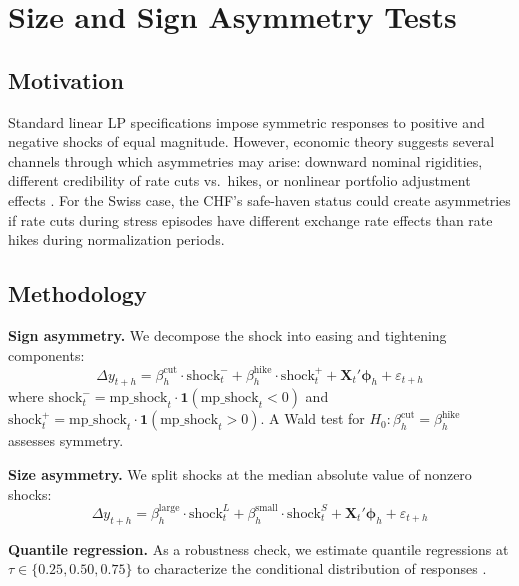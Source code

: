\documentclass[12pt,a4paper]{article}
\begin{document}
\section{Size and Sign Asymmetry Tests}\label{sec:asymmetry}

\subsection{Motivation}

Standard linear LP specifications impose symmetric responses to positive and negative shocks of equal magnitude. However, economic theory suggests several channels through which asymmetries may arise: downward nominal rigidities, different credibility of rate cuts vs.\ hikes, or nonlinear portfolio adjustment effects \citep{tenreyro2016}. For the Swiss case, the CHF's safe-haven status \citep{ranaldo2010} could create asymmetries if rate cuts during stress episodes have different exchange rate effects than rate hikes during normalization periods.

\subsection{Methodology}

\textbf{Sign asymmetry.} We decompose the shock into easing and tightening components:
\begin{equation}
	\Delta y_{t+h} = \beta_h^{\text{cut}} \cdot \text{shock}_t^{-} + \beta_h^{\text{hike}} \cdot \text{shock}_t^{+} + \boldsymbol{X}_t'\boldsymbol{\phi}_h + \varepsilon_{t+h}
\end{equation}
where $\text{shock}_t^{-} = \text{mp\_shock}_t \cdot \mathbf{1}(\text{mp\_shock}_t < 0)$ and $\text{shock}_t^{+} = \text{mp\_shock}_t \cdot \mathbf{1}(\text{mp\_shock}_t > 0)$. A Wald test for $H_0: \beta_h^{\text{cut}} = \beta_h^{\text{hike}}$ assesses symmetry.

\textbf{Size asymmetry.} We split shocks at the median absolute value of nonzero shocks:
\begin{equation}
	\Delta y_{t+h} = \beta_h^{\text{large}} \cdot \text{shock}_t^{L} + \beta_h^{\text{small}} \cdot \text{shock}_t^{S} + \boldsymbol{X}_t'\boldsymbol{\phi}_h + \varepsilon_{t+h}
\end{equation}

\textbf{Quantile regression.} As a robustness check, we estimate quantile regressions at $\tau \in \{0.25, 0.50, 0.75\}$ to characterize the conditional distribution of responses \citep{koenker1978}.
\end{document}
